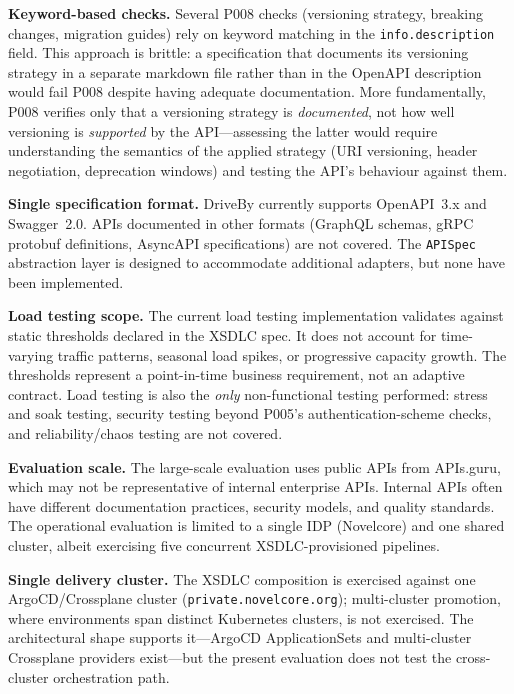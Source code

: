 \textbf{Keyword-based checks.} Several P008 checks (versioning strategy, breaking changes, migration guides) rely on keyword matching in the \texttt{info.description} field. This approach is brittle: a specification that documents its versioning strategy in a separate markdown file rather than in the OpenAPI description would fail P008 despite having adequate documentation. More fundamentally, P008 verifies only that a versioning strategy is \emph{documented}, not how well versioning is \emph{supported} by the API---assessing the latter would require understanding the semantics of the applied strategy (URI versioning, header negotiation, deprecation windows) and testing the API's behaviour against them.

\textbf{Single specification format.} DriveBy currently supports OpenAPI~3.x and Swagger~2.0. APIs documented in other formats (GraphQL schemas, gRPC protobuf definitions, AsyncAPI specifications) are not covered. The \texttt{APISpec} abstraction layer is designed to accommodate additional adapters, but none have been implemented.

\textbf{Load testing scope.} The current load testing implementation validates against static thresholds declared in the XSDLC spec. It does not account for time-varying traffic patterns, seasonal load spikes, or progressive capacity growth. The thresholds represent a point-in-time business requirement, not an adaptive contract. Load testing is also the \emph{only} non-functional testing performed: stress and soak testing, security testing beyond P005's authentication-scheme checks, and reliability/chaos testing are not covered.

\textbf{Evaluation scale.} The large-scale evaluation uses public APIs from APIs.guru, which may not be representative of internal enterprise APIs. Internal APIs often have different documentation practices, security models, and quality standards. The operational evaluation is limited to a single IDP (Novelcore) and one shared cluster, albeit exercising five concurrent XSDLC-provisioned pipelines.

\textbf{Single delivery cluster.} The XSDLC composition is exercised against one ArgoCD/Crossplane cluster (\texttt{private.novelcore.org}); multi-cluster promotion, where environments span distinct Kubernetes clusters, is not exercised. The architectural shape supports it---ArgoCD ApplicationSets and multi-cluster Crossplane providers exist---but the present evaluation does not test the cross-cluster orchestration path.

